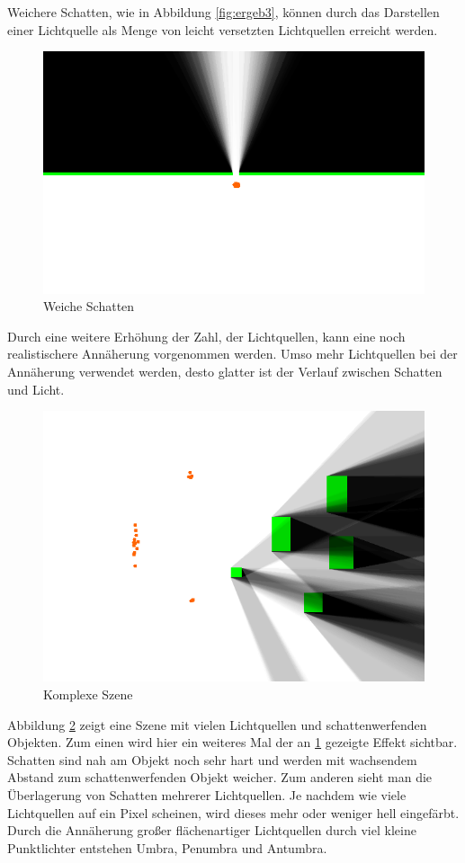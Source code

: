 Weichere Schatten, wie in Abbildung \ref{fig:ergeb3}, können durch das Darstellen einer Lichtquelle
als Menge von leicht versetzten Lichtquellen erreicht werden.

\begin{figure}[t]
	\centering
	\includegraphics[width=\columnwidth]{images/ergebnis.png}
	\caption{Weiche Schatten}
	\label{fig:ergeb2}
\end{figure}

Durch eine weitere Erhöhung der Zahl, der Lichtquellen, kann eine noch realistischere Annäherung
vorgenommen werden. Umso mehr Lichtquellen bei der Annäherung verwendet werden, desto glatter ist
der Verlauf zwischen Schatten und Licht.

\begin{figure}[t]
	\centering
	\includegraphics[width=\columnwidth]{images/ergebnis_4.png}
	\caption{Komplexe Szene}
	\label{fig:ergeb1}
\end{figure}

Abbildung \ref{fig:ergeb1} zeigt eine Szene mit vielen Lichtquellen und schattenwerfenden Objekten.
Zum einen wird hier ein weiteres Mal der an \ref{fig:ergeb2} gezeigte Effekt sichtbar. Schatten
sind nah am Objekt noch sehr hart und werden mit wachsendem Abstand zum schattenwerfenden Objekt
weicher. Zum anderen sieht man die Überlagerung von Schatten mehrerer Lichtquellen. Je nachdem wie
viele Lichtquellen auf ein Pixel scheinen, wird dieses mehr oder weniger hell eingefärbt. Durch die
Annäherung großer flächenartiger Lichtquellen durch viel kleine Punktlichter entstehen Umbra,
Penumbra und Antumbra.
